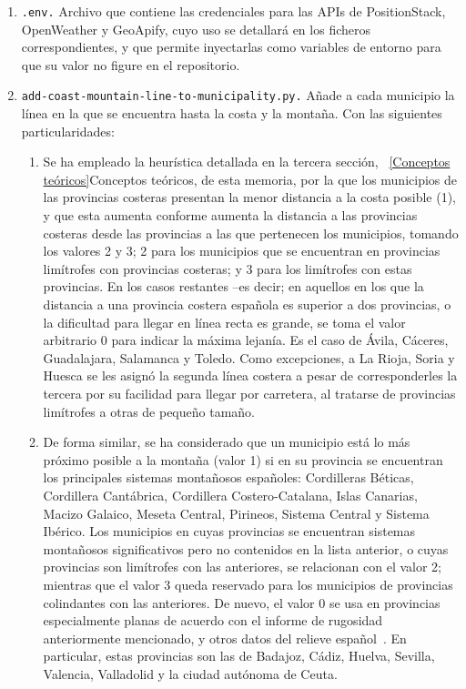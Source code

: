 \begin{enumerate}
    \item \texttt{.env.} Archivo que contiene las credenciales para las APIs de PositionStack, OpenWeather y GeoApify, cuyo uso se detallará en los ficheros correspondientes, y que permite inyectarlas como variables de entorno para que su valor no figure en el repositorio.
    
    \item \texttt{add-coast-mountain-line-to-municipality.py.} Añade a cada municipio la línea en la que se encuentra hasta la costa y la montaña. Con las siguientes particularidades:

    \begin{enumerate}
        \item Se ha empleado la heurística detallada en la tercera sección, ~\ref{Conceptos teóricos}{\guillemotleft Conceptos teóricos\guillemotright}, de esta memoria, por la que los municipios de las provincias costeras presentan la menor distancia a la costa posible (1), y que esta aumenta conforme aumenta la distancia a las provincias costeras desde las provincias a las que pertenecen los municipios, tomando los valores 2 y 3; 2 para los municipios que se encuentran en provincias limítrofes con provincias costeras; y 3 para los limítrofes con estas provincias. En los casos restantes –es decir; en aquellos en los que la distancia a una provincia costera española es superior a dos provincias, o la dificultad para llegar en línea recta es grande, se toma el valor arbitrario 0 para indicar la máxima lejanía. Es el caso de Ávila, Cáceres, Guadalajara, Salamanca y Toledo. Como excepciones, a La Rioja, Soria y Huesca se les asignó la segunda línea costera a pesar de corresponderles la tercera por su facilidad para llegar por carretera, al tratarse de provincias limítrofes a otras de pequeño tamaño.

        \item De forma similar, se ha considerado que un municipio está lo más próximo posible a la montaña (valor 1) si en su provincia se encuentran los principales sistemas montañosos españoles: Cordilleras Béticas, Cordillera Cantábrica, Cordillera Costero-Catalana, Islas Canarias, Macizo Galaico, Meseta Central, Pirineos, Sistema Central y Sistema Ibérico. Los municipios en cuyas provincias se encuentran sistemas montañosos significativos pero no contenidos en la lista anterior, o cuyas provincias son limítrofes con las anteriores, se relacionan con el valor 2; mientras que el valor 3 queda reservado para los municipios de provincias colindantes con las anteriores. De nuevo, el valor 0 se usa en provincias especialmente planas de acuerdo con el informe de rugosidad anteriormente mencionado, y otros datos del relieve español~\cite{relieve}. En particular, estas provincias son las de Badajoz, Cádiz, Huelva, Sevilla, Valencia, Valladolid y la ciudad autónoma de Ceuta.
    \end{enumerate}


\end{enumerate}
